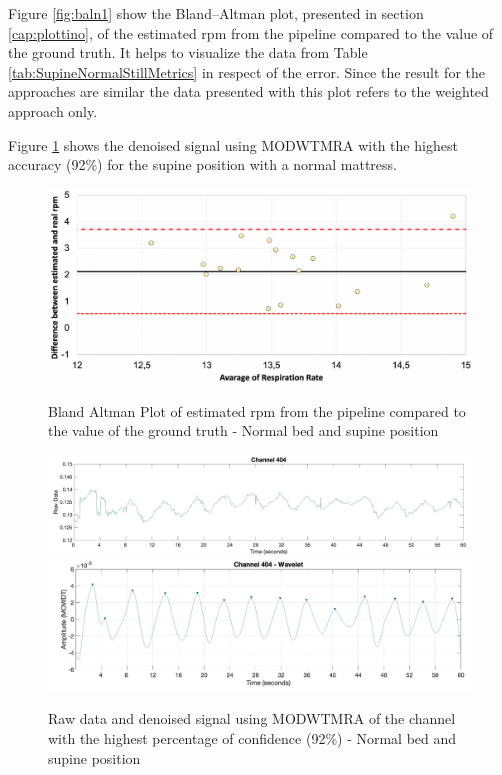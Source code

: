 

Figure \ref{fig:baln1} show the Bland–Altman plot, presented in section \ref{cap:plottino}, of the estimated rpm from the pipeline compared to the value of the ground truth. It helps to visualize the data from Table \ref{tab:SupineNormalStillMetrics} in respect of the error. Since the result for the approaches are similar the data presented with this plot refers to the weighted approach only.

Figure \ref{fig:rec} shows the denoised signal using MODWTMRA with the highest accuracy (92\%) for the supine position with a normal mattress.

\begin{figure}[p]
  \centering
  \includegraphics[width=\textwidth]{img/balnd1.pdf}

  \caption{Bland Altman Plot of estimated rpm from the pipeline compared to the value of the ground truth - Normal bed and supine position}
  \label{fig:baln1}
  \vspace{1.5cm}
  \includegraphics[width=\textwidth]{img/404.jpg}
  \includegraphics[width=\textwidth]{img/404_wave.jpg}
\caption{Raw data and denoised signal using MODWTMRA of the channel with the highest percentage of confidence (92\%) - Normal bed and supine position}
  \label{fig:rec}
\end{figure}


